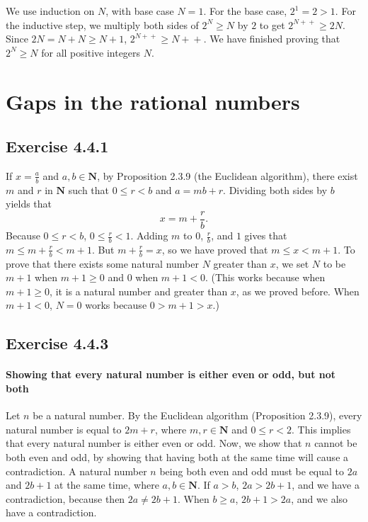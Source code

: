 \documentclass[12pt, oneside]{book}
\newcommand{\increment}{\! + \! +}
\begin{document}
	We use induction on $N$, with base case $N = 1$. For the base case, $2^1 = 2 > 1$. For the inductive step, we multiply both sides of $2^N \ge N$ by $2$ to get $2^{N \increment} \ge 2N$. Since $2N = N + N \ge N + 1$, $2^{N \increment} \ge N \increment$. We have finished proving that $2^N \ge N$ for all positive integers $N$.
	
	\section{Gaps in the rational numbers}
	
	\subsection*{Exercise 4.4.1}
	
	If $x = \frac{a}{b}$ and $a, b \in \mathbf{N}$, by Proposition 2.3.9 (the Euclidean algorithm), there exist $m$ and $r$ in $\mathbf{N}$ such that $0 \le r < b$ and $a = mb + r$. Dividing both sides by $b$ yields that
	\[x = m + \frac{r}{b}.\]
	Because $0 \le r < b$, $0 \le \frac{r}{b} < 1$. Adding $m$ to $0$, $\frac{r}{b}$, and $1$ gives that $m \le m + \frac{r}{b} < m + 1$. But $m + \frac{r}{b} = x$, so we have proved that $m \le x < m + 1$. To prove that there exists some natural number $N$ greater than $x$, we set $N$ to be $m + 1$ when $m + 1 \ge 0$ and $0$ when $m + 1 < 0$. (This works because when $m + 1 \ge 0$, it is a natural number and greater than $x$, as we proved before. When $m + 1 < 0$, $N = 0$ works because $0 > m + 1 > x$.)
	
	\subsection*{Exercise 4.4.3}
	
	\paragraph*{Showing that every natural number is either even or odd, but not both} Let $n$ be a natural number. By the Euclidean algorithm (Proposition 2.3.9), every natural number is equal to $2m + r$, where $m, r \in \mathbf{N}$ and $0 \le r < 2$. This implies that every natural number is either even or odd. Now, we show that $n$ cannot be both even and odd, by showing that having both at the same time will cause a contradiction. A natural number $n$ being both even and odd must be equal to $2a$ and $2b + 1$ at the same time, where $a, b \in \mathbf{N}$. If $a > b$, $2a > 2b + 1$, and we have a contradiction, because then $2a \ne 2b + 1$. When $b \ge a$, $2b + 1 > 2a$, and we also have a contradiction.
	
\end{document}
